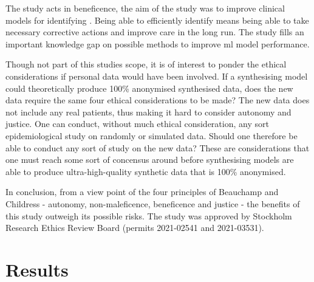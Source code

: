 \documentclass[12pt, letterpaper]{article}
\begin{document}
The study acts in beneficence, the aim of the study was to improve clinical models for identifying . Being able to efficiently identify  means being able to take necessary corrective actions and improve care in the long run. The study fills an important knowledge gap on possible methods to improve \acrshort{ml} model performance.

Though not part of this studies scope, it is of interest to ponder the ethical considerations if personal data would have been involved. If a synthesising model could theoretically produce 100\% anonymised synthesised data, does the new data require the same four ethical considerations to be made? The new data does not include any real patients, thus making it hard to consider autonomy and justice. One can conduct, without much ethical consideration, any sort epidemiological study on randomly or simulated data. Should one therefore be able to conduct any sort of study on the new data? These are considerations that one must reach some sort of concensus around before synthesising models are able to produce ultra-high-quality synthetic data that is 100\% anonymised.

In conclusion, from a view point of the four principles of Beauchamp and Childress - autonomy, non-maleficence, beneficence and justice - the benefits of this study outweigh its possible risks. The study was approved by Stockholm Research Ethics Review Board (permits 2021-02541 and 2021-03531).

\section{Results}
\end{document}
